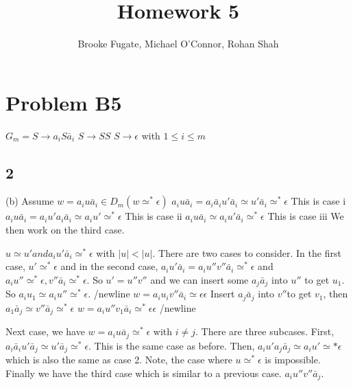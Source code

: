 \documentclass[12pt]{article}
\begin{document}
\pagestyle{plain}
\titleformat{\subsection}[runin]
  {\normalfont\large\bfseries}{\thesubsection}{1em}{}

\title{Homework 5}
\author{Brooke Fugate, Michael O'Connor, Rohan Shah}
\date{}

\maketitle

\section*{Problem B5}



$G_m = S \rightarrow a_iS \bar a_i$ \newline
$S \rightarrow SS$ \newline
$S \rightarrow \epsilon$ \newline
with $1 \le i \le m$

\subsection*{2}

\medskip

(b) 
Assume $w=a_iu \bar a_i \in D_m(w \simeq^{*} \epsilon)$ \newline
$a_iu \bar a_i = a_i \bar a_i u' \bar a_i \simeq u' \bar a_i \simeq^{*} \epsilon$ This is case i\newline
$a_iu \bar a_i = a_i u'a_i \bar a_i \simeq a_iu' \simeq^{*} \epsilon$ This is case ii \newline
$a_iu \bar a_i \simeq a_i u' \bar a_i \simeq^{*} \epsilon$ This is case iii \newline We then work on the third case.

$u \simeq u' and a_iu' \bar a_i \simeq^* \epsilon$ with $|u| < |u|$. There are two cases to consider. In the first case, $u' \simeq^{*} \epsilon$ and in the second case, $a_iu' \bar a_i = a_iu''v'' \bar a_i \simeq^{*} \epsilon$ and $a_iu'' \simeq^{*} \epsilon , v'' \bar a_i \simeq^{*} \epsilon$. So $u'=u''v''$ and we can insert some $a_j\bar a_j$ into $u''$ to get $u_1$. So $a_iu_1 \simeq a_iu'' \simeq^* \epsilon$. /newline
$w=a_iu_iv'' \bar a_i \simeq \epsilon \epsilon$ \newline
Insert $a_j \bar a_j$ into $v''$to get $v_1$, then $a_1 \bar a_j \simeq v'' \bar a_j \simeq^* \epsilon$ \newline
$w=a_iu''v_1 \bar a_i \simeq^* \epsilon \epsilon$ /newline

Next case, we have $w=a_iu \bar a_j \simeq^* \epsilon$ with $i \neq j$. There are three subcases. First, $a_i \bar a_i u' \bar a_j \simeq u' \bar a_j \simeq^* \epsilon$. This is the same case as before. Then, $a_iu'a_j \bar a_j \simeq a_iu' \simeq* \epsilon$ which is also the same as case 2. Note, the case where $u \simeq^* \epsilon$ is impossible. Finally we have the third case which is similar to a previous case. $a_iu''v'' \bar a_j$. 
\end{document}
